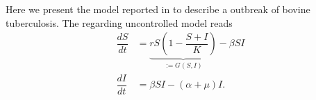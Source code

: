 Here we present the model reported in \cite*{Bolzoni2014} to describe a 
outbreak of bovine tuberculosis. The regarding uncontrolled model reads
\begin{equation}
	\begin{aligned}
		\dfrac{dS}{dt} &=
			\underbrace{
			r S 
			\left (
				1 - \dfrac{S+I}{K}
			\right)
			}_{:=G(S,I)}
			 - \beta SI %
		\\
		\dfrac{dI}{dt} &=
			\beta SI - (\alpha + \mu) I.
	\end{aligned}
\end{equation}

